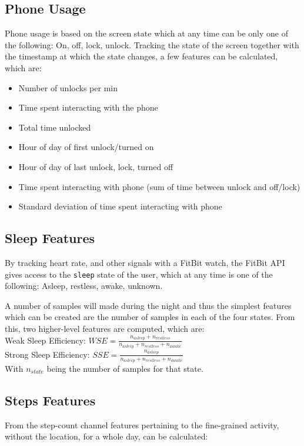 \subsection{Phone Usage}
Phone usage is based on the screen state which at any time can be only one of the following: On, off, lock, unlock. Tracking the state of the screen together with the timestamp at which the state changes, a few features can be calculated, which are:

\begin{itemize}
    \item Number of unlocks per min
    \item Time spent interacting with the phone
    \item Total time unlocked
    \item Hour of day of first unlock/turned on
    \item Hour of day of last unlock, lock, turned off
    \item Time spent interacting with phone (sum of time between unlock and off/lock)
    \item Standard deviation of time spent interacting with phone
\end{itemize}


\subsection{Sleep Features}
By tracking heart rate, and other signals with a FitBit watch, the FitBit API gives access to the \verb|sleep| state of the user, which at any time is one of the following: Asleep, restless, awake, unknown.

A number of samples will made during the night and thus the simplest features which can be created are the number of samples in each of the four states. 
From this, two higher-level features are computed, which are: \\

Weak Sleep Efficiency: $WSE = \frac{n_{asleep} + n_{restless}}{n_{asleep} + n_{restless} + n_{awake}}$\\

Strong Sleep Efficiency: $SSE = \frac{n_{asleep}}{n_{asleep} + n_{restless} + n_{awake}}$\\

With $n_{state}$ being the number of samples for that state.


\subsection{Steps Features}
From the step-count channel features pertaining to the fine-grained activity, without the location, for a whole day, can be calculated:

